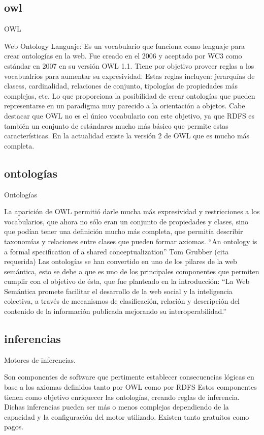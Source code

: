 \subsection{owl}

OWL

Web Ontology Languaje: Es un vocabulario que funciona como lenguaje para crear ontologías en la web. Fue creado en el 2006 y aceptado 
por WC3 como estándar en 2007 en su versión OWL 1.1. Tiene por objetivo proveer reglas a los vocabualrios para aumentar su expresividad. 
Estas reglas incluyen: jerarquías de clasess, cardinalidad, relaciones de conjunto, tipologías de propiedades más complejas, etc. Lo que proporciona la posibilidad de crear ontologías que pueden 
representarse en un paradigma muy parecido a la orientación a objetos. Cabe destacar que OWL no es el único vocabulario con este objetivo, ya que RDFS 
es también un conjunto de estándares mucho más básico que permite estas características.
En la actualidad existe la versión 2 de OWL que es mucho más completa.

\subsection{ontologías}

Ontologías

La aparición de OWL permitió darle mucha más expresividad y restricciones a los vocabularios, que ahora no sólo eran un conjunto de 
propiedades y clases, sino que podían tener una definición mucho más completa, que permitía describir taxonomías y relaciones entre clases que pueden formar axiomas.
``An ontology is a formal specification of a shared conceptualization'' Tom Grubber (cita requerida)
Las ontologías se han convertido en uno de los pilares de la web semántica, esto se debe a que es uno de los principales componentes que permiten 
cumplir con el objetivo de ésta, que fue planteado en la introducción: ``La Web Semántica promete facilitar el desarrollo de la web social y la inteligencia colectiva, a través de mecanismos de clasificación, relación y descripción del contenido de la información publicada mejorando su interoperabilidad.''

\subsection{inferencias}

Motores de inferencias.

Son componentes de software que pertimente establecer consecuencias lógicas en base a los axiomas definidos tanto por OWL como por RDFS
Estos componentes tienen como objetivo enriquecer las ontologías, creando reglas de inferencia. 
Dichas inferencias pueden ser más o menos complejas dependiendo de la capacidad y la configuración del motor utilizado. Existen tanto gratuitos 
como pagos.


